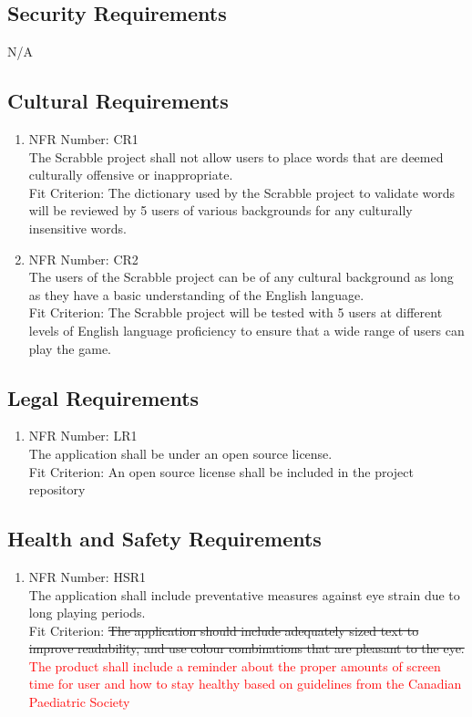\documentclass[12pt, titlepage]{article}
\begin{document}
\subsection{Security Requirements}
N/A
\subsection{Cultural Requirements} %
\begin{enumerate}
    \item NFR Number: CR1 \\
    The Scrabble project shall not allow users to place words that are deemed culturally offensive or inappropriate.  \\
    Fit Criterion: The dictionary used by the Scrabble project to validate words will be reviewed by 5 users of various backgrounds for any culturally insensitive words.
    \item NFR Number: CR2\\
    The users of the Scrabble project can be of any cultural background as long as they have a basic understanding of the English language.\\
    Fit Criterion: The Scrabble project will be tested with 5 users at different levels of English language proficiency to ensure that a wide range of users can play the game. 
\end{enumerate}
\subsection{Legal Requirements}
\begin{enumerate}
    \item NFR Number: LR1 \\
    The application shall be under an open source license. \\
    Fit Criterion: An open source license shall be included in the project repository
\end{enumerate}

\subsection{Health and Safety Requirements} 
\begin{enumerate}
    \item NFR Number: HSR1\\
    The application shall include preventative measures against eye strain due to long playing periods.\\ 
    Fit Criterion: \sout{The application should include adequately sized text to improve readability, and use colour combinations that are pleasant to the eye.} \textcolor{red}{The product shall include a reminder about the proper amounts of screen time for user and how to stay healthy based on guidelines from the Canadian Paediatric Society \textcolor{red}{\cite{canadian_paediatric}}}
\end{enumerate}
\end{document}
